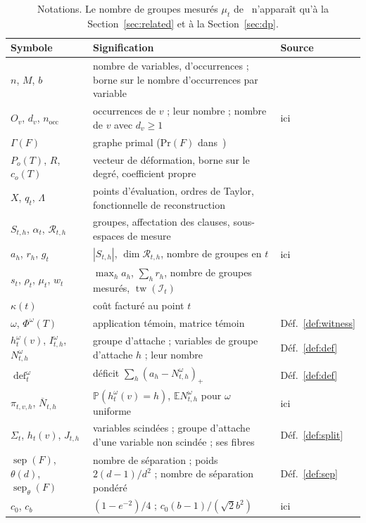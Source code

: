 \documentclass[11pt,a4paper]{article}
\theoremstyle{definition}
\theoremstyle{remark}
\newcommand{\E}{\mathbb{E}}
\newcommand{\PP}{\mathbb{P}}
\newcommand{\cR}{\mathcal{R}}
\newcommand{\cI}{\mathcal{I}}
\newcommand{\sep}{\operatorname{sep}}
\newcommand{\sepw}{\operatorname{sep}_{\theta}}
\newcommand{\dfc}{\operatorname{def}}
\newcommand{\tw}{\operatorname{tw}}
\newcommand{\Gr}{\Gamma}
\newcommand{\nocc}{n_{\mathrm{occ}}}
\newcommand{\Nbar}{\overline{N}}
\begin{document}
\begin{table}[t]
\centering
\small
\begin{tabular}{@{}>{\raggedright\arraybackslash}p{3.1cm}>{\raggedright\arraybackslash}p{9.6cm}l@{}}
\toprule
Symbole & Signification & Source\\
\midrule
$n$, $M$, $b$ & nombre de variables, d'occurrences ; borne sur le nombre d'occurrences par variable & \cite{DL}\\
$O_v$, $d_v$, $\nocc$ & occurrences de $v$ ; leur nombre ; nombre de $v$ avec $d_v\ge1$ & ici\\
$\Gr(F)$ & graphe primal ($\mathrm{Pr}(F)$ dans~\cite{DL}) & \cite{DL}\\
$P_o(T)$, $R$, $c_o(T)$ & vecteur de déformation, borne sur le degré, coefficient propre & \cite{DL}\\
$X$, $q_t$, $\Lambda$ & points d'évaluation, ordres de Taylor, fonctionnelle de reconstruction & \cite{DL}\\
$S_{t,h}$, $\alpha_t$, $\cR_{t,h}$ & groupes, affectation des clauses, sous-espaces de mesure & \cite{DL}\\
$a_h$, $r_h$, $g_t$ & $|S_{t,h}|$, $\dim\cR_{t,h}$, nombre de groupes en $t$ & ici\\
$s_t$, $\rho_t$, $\mu_t$, $w_t$ & $\max_ha_h$, $\sum_hr_h$, nombre de groupes mesurés, $\tw(\cI_t)$ & \cite{DL}\\
$\kappa(t)$ & coût facturé au point $t$ & \cite{DL}\\
$\omega$, $\Phi^\omega(T)$ & application témoin, matrice témoin & Déf.~\ref{def:witness}\\
$h^\omega_t(v)$, $I^\omega_{t,h}$, $N^\omega_{t,h}$ & groupe d'attache ; variables de groupe d'attache $h$ ; leur nombre & Déf.~\ref{def:def}\\
$\dfc^\omega_t$ & déficit $\sum_h(a_h-N^\omega_{t,h})_+$ & Déf.~\ref{def:def}\\
$\pi_{t,v,h}$, $\Nbar_{t,h}$ & $\PP(h^\omega_t(v)=h)$, $\E N^\omega_{t,h}$ pour $\omega$ uniforme & ici\\
$\Sigma_t$, $h_t(v)$, $J_{t,h}$ & variables scindées ; groupe d'attache d'une variable non scindée ; ses fibres & Déf.~\ref{def:split}\\
$\sep(F)$, $\theta(d)$, $\sepw(F)$ & nombre de séparation ; poids $2(d-1)/d^2$ ; nombre de séparation pondéré & Déf.~\ref{def:sep}\\
$c_0$, $c_b$ & $(1-e^{-2})/4$ ; $c_0(b-1)/(\sqrt2b^2)$ & ici\\
\bottomrule
\end{tabular}
\caption{Notations. Le nombre de groupes mesurés $\mu_t$ de~\cite{DL} n'apparaît qu'à la
Section~\ref{sec:related} et à la Section~\ref{sec:dp}.}\label{tab:notation}
\end{table}
\end{document}
